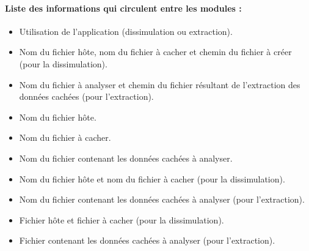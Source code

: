 \documentclass[11pt]{article}
\begin{document}
\paragraph{Liste des informations qui circulent entre les modules :}

\begin{description}
\small
\item[1)] 
\begin{itemize}
\item Utilisation de l'application (dissimulation ou extraction).
\item Nom du fichier hôte, nom du fichier à cacher et chemin du fichier à créer
    (pour la dissimulation).
\item Nom du fichier à analyser et chemin du fichier résultant de l'extraction
    des données cachées (pour l'extraction).
\end{itemize}
\item[2)] 
\begin{itemize}
\item Nom du fichier hôte.
\item Nom du fichier à cacher.
\end{itemize}
\item[3)] 
\begin{itemize}
\item Nom du fichier contenant les données cachées à analyser.
\end{itemize}
\item[4)] 
\begin{itemize}
\item Nom du fichier hôte et nom du fichier à cacher (pour la dissimulation).
\item Nom du fichier contenant les données cachées à analyser (pour
    l'extraction).
\end{itemize}
\item[5)]
\begin{itemize}
\item Fichier hôte et fichier à cacher (pour la dissimulation).
\item Fichier contenant les données cachées à analyser (pour l'extraction).
\end{itemize}
\item[6)]
\begin{itemize}

\end{itemize}
\end{description}
\end{document}
